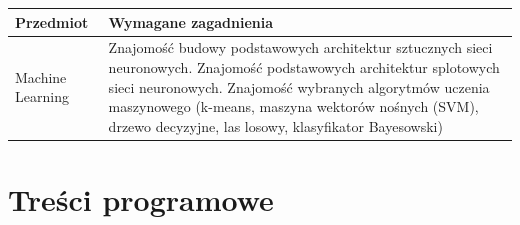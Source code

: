 \documentclass[12pt, a4paper]{article}
\begin{document}
\begin{tabularx}{\textwidth}{lX}
  \hline
  \textbf{Przedmiot} & \textbf{Wymagane zagadnienia} \\
  \hline
  Machine Learning & Znajomość budowy podstawowych architektur sztucznych sieci neuronowych. Znajomość podstawowych architektur splotowych sieci neuronowych. Znajomość wybranych algorytmów uczenia maszynowego (k-means, maszyna wektorów nośnych (SVM), drzewo decyzyjne, las losowy, klasyfikator Bayesowski) \\
  \hline
\end{tabularx}

\section{Treści programowe}
\end{document}
